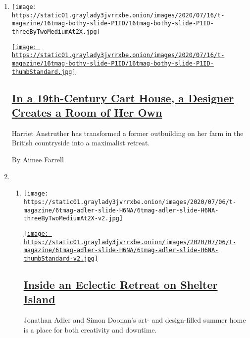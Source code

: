\begin{enumerate}
\def\labelenumi{\arabic{enumi}.}
\item
  \texttt{[image: https://static01.graylady3jvrrxbe.onion/images/2020/07/16/t-magazine/16tmag-bothy-slide-P1ID/16tmag-bothy-slide-P1ID-threeByTwoMediumAt2X.jpg]}

  \href{/2020/07/31/t-magazine/design-bothy-anstruther.html}{\texttt{[image: https://static01.graylady3jvrrxbe.onion/images/2020/07/16/t-magazine/16tmag-bothy-slide-P1ID/16tmag-bothy-slide-P1ID-thumbStandard.jpg]}}

  \hypertarget{in-a-19th-century-cart-house-a-designer-creates-a-room-of-her-own}{%
  \subsection{\texorpdfstring{\href{/2020/07/31/t-magazine/design-bothy-anstruther.html}{In
  a 19th-Century Cart House, a Designer Creates a Room of Her
  Own}}{In a 19th-Century Cart House, a Designer Creates a Room of Her Own}}\label{in-a-19th-century-cart-house-a-designer-creates-a-room-of-her-own}}

  Harriet Anstruther has transformed a former outbuilding on her farm in
  the British countryside into a maximalist retreat.

  By Aimee Farrell
\item
  \begin{enumerate}
  \def\labelenumii{\arabic{enumii}.}
  \item
    \texttt{[image: https://static01.graylady3jvrrxbe.onion/images/2020/07/06/t-magazine/6tmag-adler-slide-H6NA/6tmag-adler-slide-H6NA-threeByTwoMediumAt2X-v2.jpg]}

    \href{/2020/07/10/t-magazine/jonathan-adler-simon-doonan-home.html}{\texttt{[image: https://static01.graylady3jvrrxbe.onion/images/2020/07/06/t-magazine/6tmag-adler-slide-H6NA/6tmag-adler-slide-H6NA-thumbStandard-v2.jpg]}}

    \hypertarget{inside-an-eclectic-retreat-on-shelter-island}{%
    \subsection{\texorpdfstring{\href{/2020/07/10/t-magazine/jonathan-adler-simon-doonan-home.html}{Inside
    an Eclectic Retreat on Shelter
    Island}}{Inside an Eclectic Retreat on Shelter Island}}\label{inside-an-eclectic-retreat-on-shelter-island}}

    Jonathan Adler and Simon Doonan's art- and design-filled summer home
    is a place for both creativity and downtime.


\end{enumerate}
\end{enumerate}

